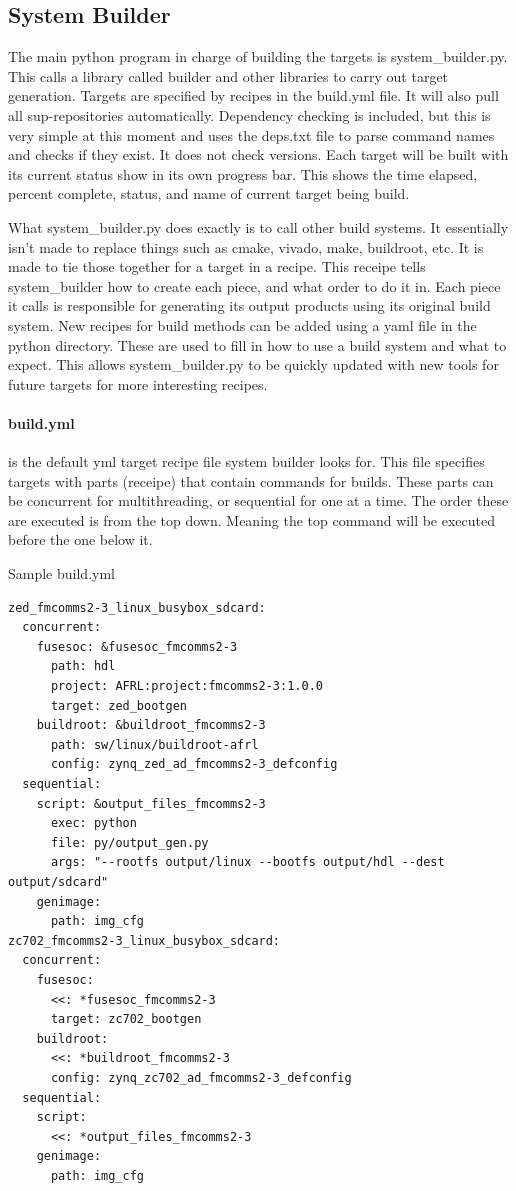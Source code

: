\subsection{System Builder}

\par
The main python program in charge of building the targets is system\_builder.py. This calls a library called builder and other libraries to carry out target generation.
Targets are specified by recipes in the build.yml file. It will also pull all sup-repositories automatically. Dependency checking is included, but this is very simple at this moment
and uses the deps.txt file to parse command names and checks if they exist. It does not check versions. Each target will be built with its current status show in its own progress bar.
This shows the time elapsed, percent complete, status, and name of current target being build.
\par
What system\_builder.py does exactly is to call other build systems. It essentially isn't made to replace things such as cmake, vivado, make, buildroot, etc. It is made
to tie those together for a target in a recipe. This receipe tells system\_builder how to create each piece, and what order to do it in. Each piece it calls is responsible for
generating its output products using its original build system. New recipes for build methods can be added using a yaml file in the python directory. These are used to fill in how
to use a build system and what to expect. This allows system\_builder.py to be quickly updated with new tools for future targets for more interesting recipes.

\paragraph{build.yml} is the default yml target recipe file system builder looks for. This file specifies targets with parts (receipe) that contain commands for builds.
These parts can be concurrent for multithreading, or sequential for one at a time. The order these are executed is from the top down. Meaning the
top command will be executed before the one below it.

Sample build.yml
\begin{lstlisting}[language={}]
zed_fmcomms2-3_linux_busybox_sdcard:
  concurrent:
    fusesoc: &fusesoc_fmcomms2-3
      path: hdl
      project: AFRL:project:fmcomms2-3:1.0.0
      target: zed_bootgen
    buildroot: &buildroot_fmcomms2-3
      path: sw/linux/buildroot-afrl
      config: zynq_zed_ad_fmcomms2-3_defconfig
  sequential:
    script: &output_files_fmcomms2-3
      exec: python
      file: py/output_gen.py
      args: "--rootfs output/linux --bootfs output/hdl --dest output/sdcard"
    genimage:
      path: img_cfg
zc702_fmcomms2-3_linux_busybox_sdcard:
  concurrent:
    fusesoc:
      <<: *fusesoc_fmcomms2-3
      target: zc702_bootgen
    buildroot:
      <<: *buildroot_fmcomms2-3
      config: zynq_zc702_ad_fmcomms2-3_defconfig
  sequential:
    script:
      <<: *output_files_fmcomms2-3
    genimage:
      path: img_cfg
\end{lstlisting}

